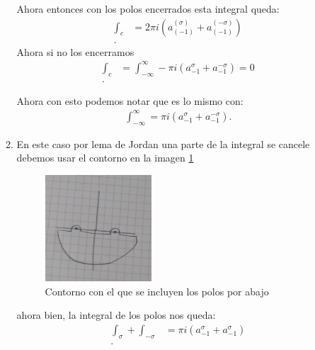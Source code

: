 \documentclass{report}
\begin{document}
\begin{enumerate}
\begin{enumerate}
	  Ahora entonces con los polos encerrados esta integral queda:
	  \begin{align*}
	    \int_{c}&= 2\pi i\left( a^{\left( \sigma \right)}_{\left( -1 \right) }+a^{\left( -\sigma \right) }_{\left( -1 \right) } \right)  \\
	  .\end{align*}
	  Ahora si no los encerramos
	  \begin{align*}
	    \int_{c}&=\int_{-\infty}^{\infty}-\pi i \left( a^{\sigma}_{-1} + a^{-\sigma}_{-1} \right) = 0  \\
	  .\end{align*}

	  Ahora con esto podemos notar que es lo mismo con:
	  \begin{align*}
	    \int_{-\infty}^{\infty}=\pi i \left( a_{-1}^{\sigma} + a_{-1}^{-\sigma} \right) 
	  .\end{align*}

	\item En este caso por lema de Jordan una parte de la integral se cancele debemos usar el contorno en la imagen \ref{fig:contornob}
	  \begin{figure}[h]
	    \centering
	    \includegraphics[width=0.4\textwidth]{Graficas/contorno_b.jpeg}
	    \caption{Contorno con el que se incluyen los polos por abajo}
	    \label{fig:contornob}
	  \end{figure}

	  ahora bien, la integral de los polos nos queda:
	  \begin{align*}
	    \int_{\sigma}+\int_{-\sigma}&= \pi i\left( a^{\sigma}_{-1}+ a^{\sigma}_{-1} \right)  \\
	  .\end{align*}


\end{enumerate}
\end{enumerate}
\end{document}
